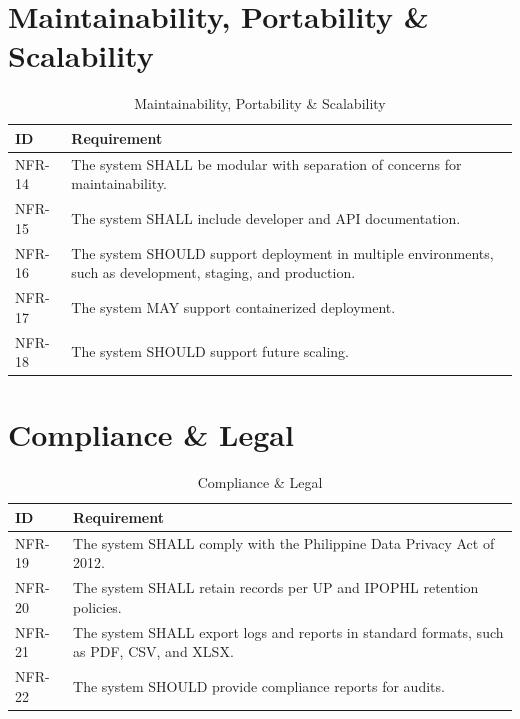 \section{Maintainability, Portability \& Scalability}

\begin{table}[H]
\centering
\setlength{\tabcolsep}{6pt}
\renewcommand{\arraystretch}{1.05}
\small
\caption{Maintainability, Portability \& Scalability}
\begin{tabular}{|p{2.2cm}|p{12cm}|}
\hline
\textbf{ID} & \textbf{Requirement} \\
\hline
NFR-14 & The system SHALL be modular with separation of concerns for maintainability. \\
\hline
NFR-15 & The system SHALL include developer and API documentation. \\
\hline
NFR-16 & The system SHOULD support deployment in multiple environments, such as development, staging, and production. \\
\hline
NFR-17 & The system MAY support containerized deployment. \\
\hline
NFR-18 & The system SHOULD support future scaling. \\
\hline
\end{tabular}
\end{table}

\section{Compliance \& Legal}

\begin{table}[H]
\centering
\setlength{\tabcolsep}{6pt}
\renewcommand{\arraystretch}{1.05}
\small
\caption{Compliance \& Legal}
\label{tab:nfr_compliance}
\begin{tabular}{|p{2.2cm}|p{12cm}|}
\hline
\textbf{ID} & \textbf{Requirement} \\
\hline
NFR-19 & The system SHALL comply with the Philippine Data Privacy Act of 2012. \\
\hline
NFR-20 & The system SHALL retain records per UP and IPOPHL retention policies. \\
\hline
NFR-21 & The system SHALL export logs and reports in standard formats, such as PDF, CSV, and XLSX. \\
\hline
NFR-22 & The system SHOULD provide compliance reports for audits. \\
\hline
\end{tabular}
\end{table}